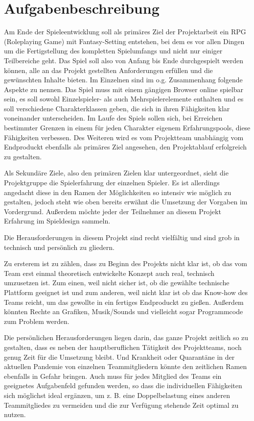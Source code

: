 

\section{Aufgabenbeschreibung}


Am Ende der Spieleentwicklung soll als primäres Ziel der Projektarbeit ein RPG (Roleplaying Game) mit Fantasy-Setting entstehen, bei dem es vor allen Dingen um die Fertigstellung des kompletten Spielumfangs und nicht nur einiger Teilbereiche geht. Das Spiel soll also von Anfang bis Ende durchgespielt werden können, alle an das Projekt gestellten Anforderungen erfüllen und die gewünschten Inhalte bieten. Im Einzelnen sind im o.g. Zusammenhang folgende Aspekte zu nennen. Das Spiel muss mit einem gängigen Browser online spielbar sein, es soll sowohl Einzelspieler- als auch Mehrspielerelemente enthalten und es soll verschiedene Charakterklassen geben, die sich in ihren Fähigkeiten klar voneinander unterscheiden. Im Laufe des Spiels sollen sich, bei Erreichen bestimmter Grenzen in einem für jeden Charakter eigenem Erfahrungspools, diese Fähigkeiten verbessen. Des Weiteren wird es vom Projektteam unabhängig vom Endproduckt ebenfalls als primäres Ziel angesehen, den Projektablauf erfolgreich zu gestalten.

Als Sekundäre Ziele, also den primären Zielen klar untergeordnet, sieht die Projektgruppe die Spielerfahrung der einzelnen Spieler. Es ist allerdings angedacht diese in den Ramen der Möglichkeiten so intensiv wie möglich zu gestalten, jedoch steht wie oben bereits erwähnt die Umsetzung der Vorgaben im Vordergrund. Außerdem möchte jeder der Teilnehmer an diesem Projekt Erfahrung im Spieldesign sammeln.

Die Herausforderungen in diesem Projekt sind recht vielfältig und sind grob in technisch und persönlich zu gliedern.

Zu ersterem ist zu zählen, dass zu Beginn des Projekts nicht klar ist, ob das vom Team erst einmal theoretisch entwickelte Konzept auch real, technisch umzusetzen ist. Zum einen, weil nicht sicher ist, ob die gewählte technische Plattform geeignet ist und zum anderen, weil nicht klar ist ob das Know-how des Teams reicht, um das gewollte in ein fertiges Endproduckt zu gießen. Außerdem könnten Rechte an Grafiken, Musik/Sounds und vielleicht sogar Programmcode zum Problem werden.

Die persönlichen Herausforderungen liegen darin, das ganze Projekt zeitlich so zu gestalten, dass es neben der hauptberuflichen Tätigkeit des Projektteams, noch genug Zeit für die Umsetzung bleibt. Und Krankheit oder Quarantäne in der aktuellen Pandemie von einzelnen Teammitgliedern könnte den zeitlichen Ramen ebenfalls in Gefahr bringen. Auch muss für jedes Mitglied des Teams ein geeignetes Aufgabenfeld gefunden werden, so dass die individuellen Fähigkeiten sich möglichst ideal ergänzen, um z. B. eine Doppelbelastung eines anderen Teammitgliedes zu vermeiden und die zur Verfügung stehende Zeit optimal zu nutzen.




